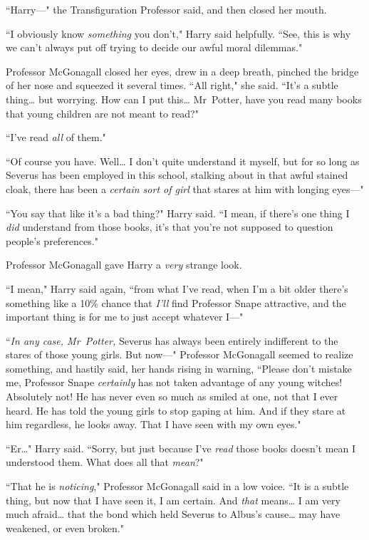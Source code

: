 ``Harry—" the Transfiguration Professor said, and then closed her mouth.

``I obviously know \emph{something} you don't," Harry said helpfully. ``See, this is why we can't always put off trying to decide our awful moral dilemmas."

Professor McGonagall closed her eyes, drew in a deep breath, pinched the bridge of her nose and squeezed it several times. ``All right," she said. ``It's a subtle thing{\ldots} but worrying. How can I put this{\ldots} Mr~Potter, have you read many books that young children are not meant to read?"

``I've read \emph{all} of them."

``Of course you have. Well{\ldots} I don't quite understand it myself, but for so long as Severus has been employed in this school, stalking about in that awful stained cloak, there has been a \emph{certain sort of girl} that stares at him with longing eyes—"

``You say that like it's a bad thing?" Harry said. ``I mean, if there's one thing I \emph{did} understand from those books, it's that you're not supposed to question people's preferences."

Professor McGonagall gave Harry a \emph{very} strange look.

``I mean," Harry said again, ``from what I've read, when I'm a bit older there's something like a 10\% chance that \emph{I'll} find Professor Snape attractive, and the important thing is for me to just accept whatever I—"

``\emph{In any case, Mr~Potter,} Severus has always been entirely indifferent to the stares of those young girls. But now—" Professor McGonagall seemed to realize something, and hastily said, her hands rising in warning, ``Please don't mistake me, Professor Snape \emph{certainly} has not taken advantage of any young witches! Absolutely not! He has never even so much as smiled at one, not that I ever heard. He has told the young girls to stop gaping at him. And if they stare at him regardless, he looks away. That I have seen with my own eyes."

``Er{\ldots}" Harry said. ``Sorry, but just because I've \emph{read} those books doesn't mean I understood them. What does all that \emph{mean}?"

``That he is \emph{noticing}," Professor McGonagall said in a low voice. ``It is a subtle thing, but now that I have seen it, I am certain. And \emph{that} means{\ldots} I am very much afraid{\ldots} that the bond which held Severus to Albus's cause{\ldots} may have weakened, or even broken."

